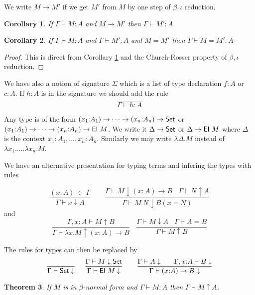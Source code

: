 \documentclass[11pt]{article}
\newtheorem{theorem}{Theorem}[section]
\newtheorem{corollary}[theorem]{Corollary}
\def\SET{\hbox{\sf Set}}
\def\EL{\hbox{\sf El}}
\begin{document}
 We write $M\rightarrow M'$ if we get $M'$ from $M$ by one step of $\beta,\iota$ reduction.

\begin{corollary}\label{red}
If $\Gamma\vdash M:A$ and $M\rightarrow M'$ then $\Gamma\vdash M':A$
\end{corollary}

\begin{corollary}\label{conv}
If $\Gamma\vdash M:A$ and $\Gamma\vdash M':A$ and $M=M'$ then
$\Gamma\vdash M=M':A$
\end{corollary}

\begin{proof}
This is direct from Corollary \ref{red} and the Church-Rosser property of
$\beta,\iota$ reduction.
\end{proof}

 We have also a notion of signature $\Sigma$ which is a list of type declaration
$f:A$ or $c:A$. If $h:A$ is in the signature we should add the rule
$$
\frac{}{\Gamma\vdash h:A}
$$

 Any type is of the form $(x_1{:}A_1)\rightarrow\dots\rightarrow (x_n{:}A_n)\rightarrow \SET$
or $(x_1{:}A_1)\rightarrow\dots\rightarrow (x_n{:}A_n)\rightarrow \EL~M$. We write it
$\Delta\rightarrow\SET$ or $\Delta\rightarrow\EL~M$ where $\Delta$ is the context
$x_1{:}A_1,\dots,x_n{:}A_n$. Similarly we may write $\lambda\Delta.M$ instead of
$\lambda x_1.\dots.\lambda x_n.M$.

 We have an alternative presentation for typing terms and infering the types with rules

$$
\frac{(x{:}A)~\in~\Gamma}{\Gamma\vdash x\downarrow A}~~~~~~~~~
\frac{\Gamma\vdash M\downarrow (x{:}A)\rightarrow B~~~~\Gamma\vdash N\uparrow A}
     {\Gamma\vdash M~N\downarrow B(x=N)}
$$
and
$$
\frac{\Gamma,x{:}A\vdash M\uparrow B}{\Gamma\vdash \lambda x.M\uparrow (x{:}A)\rightarrow B}~~~~
\frac{\Gamma\vdash M\downarrow A~~~~\Gamma\vdash A = B}{\Gamma\vdash M\uparrow B}
$$

 The rules for types can then be replaced by
$$
\frac{}{\Gamma\vdash \SET\downarrow}~~~~
\frac{\Gamma\vdash M\downarrow\SET}{\Gamma\vdash \EL~M\downarrow}~~~~~~
\frac{\Gamma\vdash A\downarrow~~~~~\Gamma,x{:}A\vdash B\downarrow}{\Gamma\vdash (x{:}A)\rightarrow B\downarrow}
$$
\begin{theorem}
If $M$ is in $\beta$-normal form and $\Gamma\vdash M{:}A$ then $\Gamma\vdash M\uparrow A$.
\end{theorem}
\end{document}
